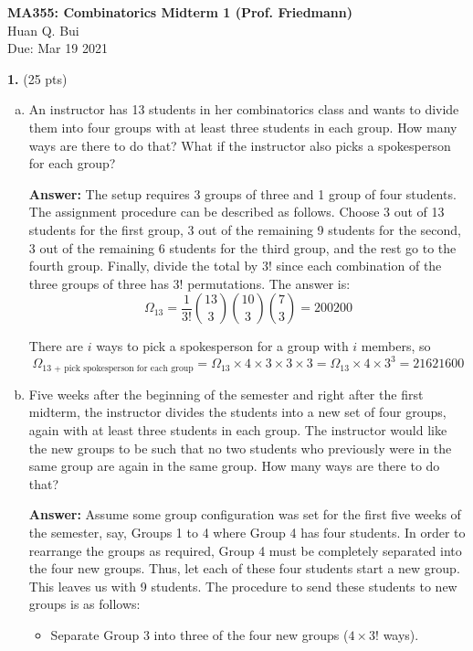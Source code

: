 \documentclass[11pt]{article}
\newcommand{\f}[2]{\frac{#1}{#2}}
\begin{document}
	\begin{framed}
\begin{center}
{\large \bf MA355: Combinatorics Midterm 1 (Prof. Friedmann)}\\
{ Huan Q. Bui}\\
Due: Mar 19 2021
\end{center}
\end{framed}

\noindent \textbf{1.} (25 pts) 
\begin{enumerate}[(a)]
	\item An instructor has 13 students in her combinatorics class and wants to divide them
	into four groups with at least three students in each group. How many ways are
	there to do that? What if the instructor also picks a spokesperson for each group?
	
	\textbf{Answer:} The setup requires 3 groups of three and 1 group of four students. The assignment procedure can be described as follows. Choose 3 out of 13 students for the first group, 3 out of the remaining 9 students for the second, 3 out of the remaining 6 students for the third group, and the rest go to the fourth group. Finally, divide the total by $3!$ since each combination of the three groups of three has $3!$ permutations. The answer is:
	\begin{equation*}
	\boxed{\Omega_{13} = \f{1}{3!}\binom{13}{3}\binom{10}{3}\binom{7}{3} = 200200}
	\end{equation*}
	
	There are $i$ ways to pick a spokesperson for a group with $i$ members, so
	\begin{equation*}
	\boxed{\Omega_\text{13 + pick spokesperson for each group} = \Omega_{13} \times 4\times 3 \times 3 \times 3 = \Omega_{13} \times 4\times 3^3 = 21621600}
	\end{equation*} 
	
	
	\item Five weeks after the beginning of the semester and right after the first midterm,
	the instructor divides the students into a new set of four groups, again with at least
	three students in each group. The instructor would like the new groups to be such
	that no two students who previously were in the same group are again in the same
	group. How many ways are there to do that?

	
	
	\textbf{Answer:} Assume some group configuration was set for the first five weeks of the semester, say, Groups 1 to 4 where Group 4 has four students. In order to rearrange the groups as required, Group 4 must be completely separated into the four new groups. Thus, let each of these four students start a new group. This leaves us with 9 students. The procedure to send these students to new groups is as follows:
	\begin{itemize}
		\item Separate Group 3 into three of the four new groups ($4\times 3!$ ways).
		

\end{itemize}
\end{enumerate}
\end{document}
